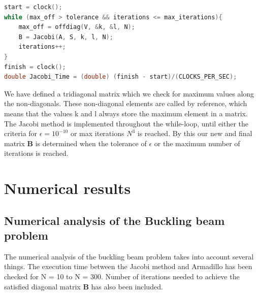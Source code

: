 \documentclass[twoside,onecolumn]{article}
\begin{document}
\begin{itemize}
\bigskip

\begin{lstlisting}[language=C++, caption = C++ While-loop, style=customc]
start = clock();
while (max_off > tolerance && iterations <= max_iterations){
    max_off = offdiag(V, &k, &l, N);
    B = Jacobi(A, S, k, l, N);
    iterations++;
}
finish = clock();
double Jacobi_Time = (double) (finish - start)/(CLOCKS_PER_SEC);
\end{lstlisting}

\bigskip

We have defined a tridiagonal matrix which we check for maximum values along the non-diagonals. These non-diagonal elements are called by reference, which means that the values k and l always store the maximum element in a matrix. The Jacobi method is implemented throughout the while-loop, until either the criteria for $\epsilon = 10^{-10}$ or max iterations $N^3$ is reached. By this our new and final matrix $\mathbf{B}$ is determined when the tolerance of $\epsilon$ or the maximum number of iterations is reached.

\end{itemize}
\section{Numerical results}


\subsection{Numerical analysis of the Buckling beam problem}

The numerical analysis of the buckling beam problem takes into account several things. The execution time between the Jacobi method and Armadillo has been checked for N = 10 to N = 300. Number of iterations needed to achieve the satisfied diagonal matrix $\bm{B}$ has also been included. 
\end{document}
